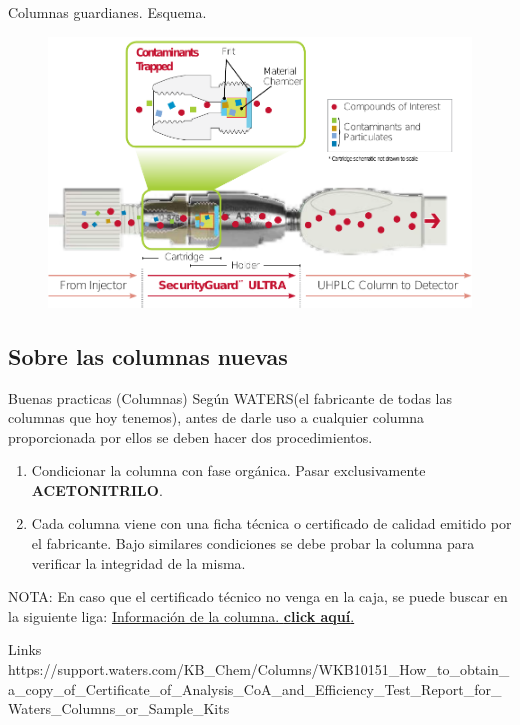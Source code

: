 \documentclass[11pt]{beamer}
\begin{document}
      \begin{frame}{Columnas guardianes. Esquema.}
          \begin{figure}
              \centering
              \includegraphics[width=1.0\linewidth]{img/drawing_2}
              \label{fig:drawing2}
          \end{figure}
      \end{frame}

      \subsection{Sobre las columnas nuevas}

      \begin{frame}{Buenas practicas (Columnas)}
        Según WATERS(el fabricante de todas las columnas que hoy tenemos), antes de darle uso a cualquier columna proporcionada por ellos se deben hacer dos procedimientos.
        \begin{enumerate}
            \item Condicionar la columna con fase orgánica. Pasar exclusivamente \textbf{ACETONITRILO}.
            \item Cada columna viene con una ficha técnica o certificado de calidad  emitido por el fabricante. Bajo similares condiciones se debe probar la columna para verificar la integridad de la misma.
        \end{enumerate}
       NOTA: En caso que el certificado técnico no venga en la caja, se puede buscar en la siguiente liga:
       \href{https://support.waters.com/KB_Chem/Columns/WKB10151_How_to_obtain_a_copy_of_Certificate_of_Analysis_CoA_and_Efficiency_Test_Report_for_Waters_Columns_or_Sample_Kits}{Información de la columna. \textbf{click aquí}.}
      \end{frame}
      \begin{frame}{Links}
         https://support.waters.com/KB\_Chem/Columns/WKB10151\_How\_to\_obtain\_a\_copy\_of\_Certificate\_of\_Analysis\_CoA\_and\_Efficiency\_Test\_Report\_for\_Waters\_Columns\_or\_Sample\_Kits
      \end{frame}
\end{document}
